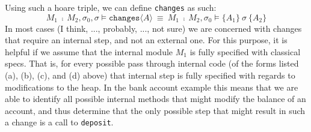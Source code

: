 \documentclass[12pt]{article}
\begin{document}
Using such a hoare triple, we can define \texttt{changes} as such:
$$M_1\ \fcmp\ M_	2, \sigma_0, \sigma \vDash \texttt{changes}\langle A \rangle\ \equiv\ M_1\ \fcmp\ M_2, \sigma_0 \vDash \{A_1\}\ \sigma\ \{ A_2\}$$
In most cases (I think, ..., probably, ..., not sure) we are concerned with changes that require an internal step, and not an external one. For this purpose, 
it is helpful if we assume that the internal module $M_1$ is fully specified with classical specs. That is, for every possible pass through internal code 
(of the forms listed (a), (b), (c), and (d) above) that internal step is fully specified with regards to modifications to the heap. In the bank account example
this means that we are able to identify all possible internal methods that might modify the balance of an account, and thus determine that the only 
possible step that might result in such a change is a call to \texttt{deposit}.










\end{document}
